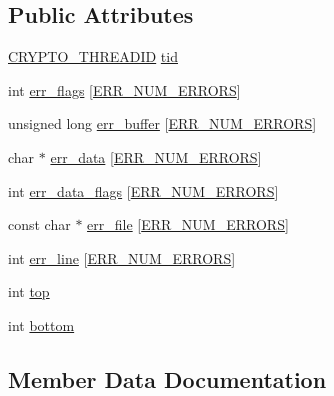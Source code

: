 \subsection*{Public Attributes}
\begin{DoxyCompactItemize}
\item 
\hyperlink{crypto_8h_a5da789a29aa0f39047c22cfe52462226}{C\+R\+Y\+P\+T\+O\+\_\+\+T\+H\+R\+E\+A\+D\+ID} \hyperlink{structerr__state__st_a9bc9ea657d62cb9d4875cdecb09993b4}{tid}
\item 
int \hyperlink{structerr__state__st_ae822060964906dc8a605919d29b20a2c}{err\+\_\+flags} \mbox{[}\hyperlink{err_8h_a98c5e234fbf0071b18ac9cfb7f3dc344}{E\+R\+R\+\_\+\+N\+U\+M\+\_\+\+E\+R\+R\+O\+RS}\mbox{]}
\item 
unsigned long \hyperlink{structerr__state__st_a6093e57e37a565c5c2ade7453856e0b8}{err\+\_\+buffer} \mbox{[}\hyperlink{err_8h_a98c5e234fbf0071b18ac9cfb7f3dc344}{E\+R\+R\+\_\+\+N\+U\+M\+\_\+\+E\+R\+R\+O\+RS}\mbox{]}
\item 
char $\ast$ \hyperlink{structerr__state__st_a75311ccdf3c5e3ab976b6b134e4ea4de}{err\+\_\+data} \mbox{[}\hyperlink{err_8h_a98c5e234fbf0071b18ac9cfb7f3dc344}{E\+R\+R\+\_\+\+N\+U\+M\+\_\+\+E\+R\+R\+O\+RS}\mbox{]}
\item 
int \hyperlink{structerr__state__st_a929c4ef844d860715e5df4935630f23c}{err\+\_\+data\+\_\+flags} \mbox{[}\hyperlink{err_8h_a98c5e234fbf0071b18ac9cfb7f3dc344}{E\+R\+R\+\_\+\+N\+U\+M\+\_\+\+E\+R\+R\+O\+RS}\mbox{]}
\item 
const char $\ast$ \hyperlink{structerr__state__st_aa8ac00e8b6a07603d015b3e067a764ea}{err\+\_\+file} \mbox{[}\hyperlink{err_8h_a98c5e234fbf0071b18ac9cfb7f3dc344}{E\+R\+R\+\_\+\+N\+U\+M\+\_\+\+E\+R\+R\+O\+RS}\mbox{]}
\item 
int \hyperlink{structerr__state__st_abdfef5b4788717ba882fda5b02c7597c}{err\+\_\+line} \mbox{[}\hyperlink{err_8h_a98c5e234fbf0071b18ac9cfb7f3dc344}{E\+R\+R\+\_\+\+N\+U\+M\+\_\+\+E\+R\+R\+O\+RS}\mbox{]}
\item 
int \hyperlink{structerr__state__st_a02b49831a2d90a87b14ae7ad28f0bfb7}{top}
\item 
int \hyperlink{structerr__state__st_a91a24fe0ee64f2618dac094713874c01}{bottom}
\end{DoxyCompactItemize}


\subsection{Member Data Documentation}
